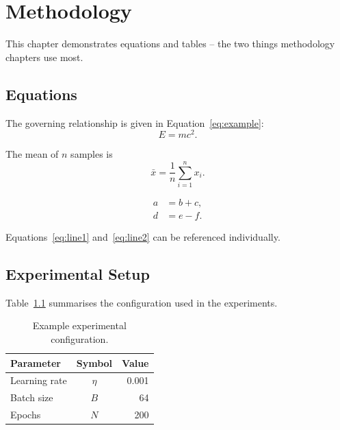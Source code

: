 \chapter{Methodology}
\label{ch:methodology}

This chapter demonstrates equations and tables -- the two things methodology
chapters use most.

\section{Equations}
\label{sec:equations}

The governing relationship is given in Equation~\ref{eq:example}:
\begin{equation}
    E = mc^2 .
    \label{eq:example}
\end{equation}

The mean of $n$ samples is
\[
    \bar{x} = \frac{1}{n} \sum_{i=1}^{n} x_i .
\]

\begin{align}
    a &= b + c, \label{eq:line1}\\
    d &= e - f. \label{eq:line2}
\end{align}

Equations~\ref{eq:line1} and~\ref{eq:line2} can be referenced individually.

\section{Experimental Setup}
\label{sec:setup}

Table~\ref{tab:setup} summarises the configuration used in the experiments.

\begin{table}[h]
    \centering
    \caption{Example experimental configuration.}
    \label{tab:setup}
    \begin{tabular}{|l|c|r|}
        \hline
        \textbf{Parameter} & \textbf{Symbol} & \textbf{Value} \\ \hline
        Learning rate      & $\eta$          & 0.001          \\ \hline
        Batch size         & $B$             & 64             \\ \hline
        Epochs             & $N$             & 200            \\ \hline
    \end{tabular}
\end{table}

\lipsum[7]
